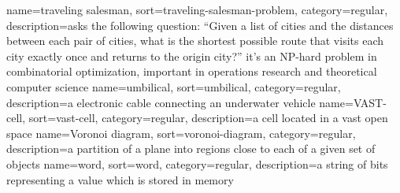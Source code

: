 {%
  name={traveling salesman},%
  sort={traveling-salesman-problem},%
  category={regular},%
  description={asks the following question: ``Given a list of cities and the distances between each pair of cities, what is the shortest possible route that visits each city exactly once and returns to the origin city?'' it's an NP-hard problem in combinatorial optimization, important in operations research and theoretical computer science}%
}
%
{%
  name={umbilical},%
  sort={umbilical},%
  category={regular},%
  description={a electronic cable connecting an underwater vehicle}%
}
%
{%
  name={VAST-cell},%
  sort={vast-cell},%
  category={regular},%
  description={a cell located in a vast open space}%
}
%
{%
  name={Voronoi diagram},%
  sort={voronoi-diagram},%
  category={regular},%
  description={a partition of a plane into regions close to each of a given set of objects}%
}
%
{%
  name={word},%
  sort={word},%
  category={regular},%
  description={a string of bits representing a value which is stored in memory}%
}
